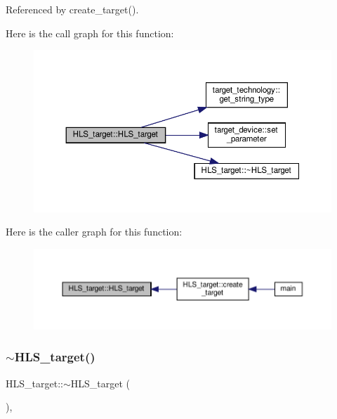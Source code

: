 Referenced by create\+\_\+target().

Here is the call graph for this function\+:
\nopagebreak
\begin{figure}[H]
\begin{center}
\leavevmode
\includegraphics[width=350pt]{dd/dff/classHLS__target_ac3a4f4a023bf8fceb35226d71bf2ad44_cgraph}
\end{center}
\end{figure}
Here is the caller graph for this function\+:
\nopagebreak
\begin{figure}[H]
\begin{center}
\leavevmode
\includegraphics[width=350pt]{dd/dff/classHLS__target_ac3a4f4a023bf8fceb35226d71bf2ad44_icgraph}
\end{center}
\end{figure}
\mbox{\label{classHLS__target_a18e32dd957d5413eb4c05dc105ea5b91}} 
\subsubsection{\texorpdfstring{$\sim$\+H\+L\+S\+\_\+target()}{~HLS\_target()}}
{\footnotesize\ttfamily H\+L\+S\+\_\+target\+::$\sim$\+H\+L\+S\+\_\+target (\begin{DoxyParamCaption}{ }\end{DoxyParamCaption})\hspace{0.3cm}{\ttfamily [override]}, {\ttfamily [default]}}



